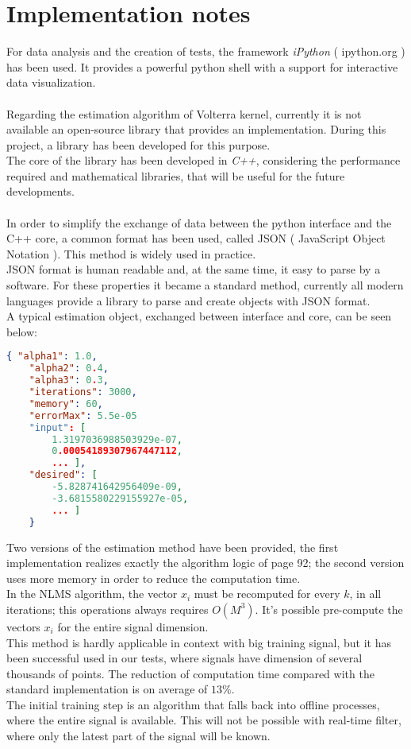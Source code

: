 \section{Implementation notes}
For data analysis and the creation of tests, the framework \textit{iPython} ( ipython.org ) has been used. It provides a powerful python shell with a support for interactive data visualization.\\\\
Regarding the estimation algorithm of Volterra kernel, currently it is not available an open-source library that provides an implementation. During this project, a library has been developed for this purpose.\\
The core of the library has been developed in \textit{C++}, considering the performance required and mathematical libraries, that will be useful for the future developments.\\\\
In order to simplify the exchange of data between the python interface and the C++ core, a common format has been used, called JSON ( JavaScript Object Notation ).
This method is widely used in practice.\\
JSON format is human readable and, at the same time, it easy to parse by a software. For these properties it became a standard method, currently all modern languages provide a library to parse and create objects with JSON format.\\
A typical estimation object, exchanged between interface and core, can be seen below:\\
\begin{center}
\begin{minipage}{\linewidth}
\begin{lstlisting}[language=json]
    { "alpha1": 1.0, 
    "alpha2": 0.4,
    "alpha3": 0.3, 
    "iterations": 3000, 
    "memory": 60, 
    "errorMax": 5.5e-05
    "input": [
        1.3197036988503929e-07, 
        0.00054189307967447112, 
        ... ],  
    "desired": [
        -5.828741642956409e-09, 
        -3.6815580229155927e-05, 
        ... ]   
	}
\end{lstlisting}
\end{minipage}
\end{center}
Two versions of the estimation method have been provided, the first implementation realizes exactly the algorithm logic of page 92; the second version uses more memory in order to reduce the computation time.\\
In the NLMS algorithm, the vector $x_i$ must be recomputed for every $k$, in all iterations; this operations always requires $O(M^3)$. It's possible pre-compute the vectors $x_i$ for the entire signal dimension.\\
This method is hardly applicable in context with big training signal, but it has been successful used in our tests, where signals have dimension of several thousands of points. The reduction of computation time compared with the standard implementation is on average of $13\%$.\\ 
The initial training step is an algorithm that falls back into offline processes, where the entire signal is available. This will not be possible with real-time filter, where only the latest part of the signal will be known.
